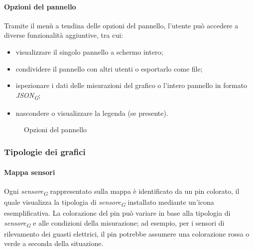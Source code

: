 \paragraph{Opzioni del pannello}
Tramite il menù a tendina delle opzioni del pannello, l'utente può accedere a diverse funzionalità aggiuntive, tra cui:
\begin{itemize}
    \item visualizzare il singolo pannello a schermo intero;
    \item condividere il pannello con altri utenti o esportarlo come file;
    \item ispezionare i dati delle misurazioni del grafico o l'intero pannello in formato \textit{JSON}\textsubscript{\textit{G}};
    \item nascondere o visualizzare la legenda (se presente).
\end{itemize}
\begin{figure}[H]
    \centering
    \caption{Opzioni del pannello}
    \label{fig:my_label}
\end{figure}


\subsubsection{Tipologie dei grafici}
\label{subsec:tipologie_grafici}

\paragraph{Mappa sensori}
\hypertarget{par:mappa_sensori}{}
Ogni \textit{sensore}\textsubscript{\textit{G}} rappresentato sulla mappa è identificato da un pin colorato, il quale visualizza la tipologia di \textit{sensore}\textsubscript{\textit{G}} installato mediante un'icona esemplificativa. La colorazione del pin può variare in base alla tipologia di \textit{sensore}\textsubscript{\textit{G}} e alle condizioni della misurazione; ad esempio, per i sensori di rilevamento dei guasti elettrici, il pin potrebbe assumere una colorazione rossa o verde a seconda della situazione.  

